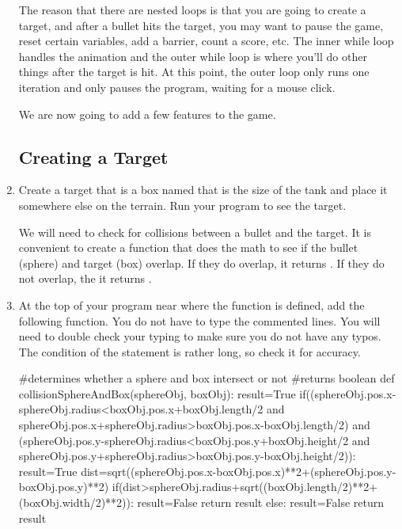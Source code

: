\begin{enumerate}
The reason that there are nested  loops is that you are going to create a target, and after a bullet hits the target, you may want to pause the game, reset certain variables, add a barrier, count a score, etc. The inner while loop handles the animation and the outer while loop is where you'll do other things after the target is hit. At this point, the outer loop only runs one iteration and only pauses the program, waiting for a mouse click.

We are now going to add a few features to the game.

\subsection*{Creating a Target}

	\item Create a target that is a box named  that is the size of the tank and place it somewhere else on the terrain. Run your program to see the target.
	
We will need to check for collisions between a bullet and the target. It is convenient to create a function that does the math to see if the bullet (sphere) and target (box) overlap. If they do overlap, it returns . If they do not overlap, the it returns .

	\item At the top of your program near where the  function is defined, add the following function. You do not have to type the commented lines. You will need to double check your typing to make sure you do not have any typos. The condition of the  statement is rather long, so check it for accuracy.
	
\begin{myvpython}
#determines whether a sphere and box intersect or not
#returns boolean
def collisionSphereAndBox(sphereObj, boxObj):
    result=True
    if((sphereObj.pos.x-sphereObj.radius<boxObj.pos.x+boxObj.length/2 and sphereObj.pos.x+sphereObj.radius>boxObj.pos.x-boxObj.length/2) and (sphereObj.pos.y-sphereObj.radius<boxObj.pos.y+boxObj.height/2 and sphereObj.pos.y+sphereObj.radius>boxObj.pos.y-boxObj.height/2)):
        result=True
        dist=sqrt((sphereObj.pos.x-boxObj.pos.x)**2+(sphereObj.pos.y-boxObj.pos.y)**2)
        if(dist>sphereObj.radius+sqrt((boxObj.length/2)**2+(boxObj.width/2)**2)):
            result=False
        return result
    else:
        result=False
    return result
\end{myvpython}


\end{enumerate}
